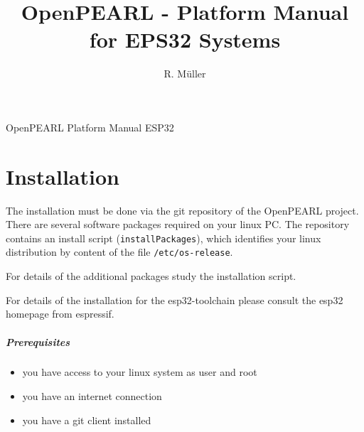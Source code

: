 \documentclass[oneside,10pt]{scrbook}
\begin{document}
\title{OpenPEARL - Platform Manual for EPS32 Systems}
\author{R. M\"uller}

 {
}%
{}%

 {
}%
{}%

\pagestyle{myheadings}
          {OpenPEARL Platform Manual ESP32}

\maketitle

\tableofcontents

%
%
%

\chapter{Installation}
The installation must be done via the git repository of the OpenPEARL project.
There are several software packages required on your linux PC. 
The repository contains an install script (\verb|installPackages|),
which identifies your
linux distribution by content of the file \verb|/etc/os-release|.

For details of the additional packages study the installation script.

For details of the installation for the esp32-toolchain please 
consult the esp32 homepage from espressif.

\paragraph{Prerequisites}
\begin{itemize}
\item you have access to your linux system as user and root
\item you have an internet connection
\item you have a git client installed
\end{itemize}
\end{document}
